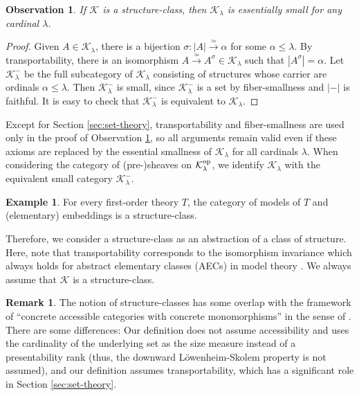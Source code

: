 \documentclass[10pt]{amsart}
\numberwithin{equation}{section}
\theoremstyle{plain}
\newtheorem{obs}[theorem]{Observation}
\theoremstyle{definition}
\newtheorem{example}[theorem]{Example}
\newtheorem*{remark}{Remark}
\newcommand{\K}{\mathcal{K}}
\newcommand{\edge}[1]{\overset{#1}{\longrightarrow}}
\begin{document}
\begin{obs}\label{obs:essentially-small}
If $\K$ is a structure-class, then $\K_\lambda$ is essentially small for any cardinal $\lambda$.
\end{obs}

\begin{proof}
Given $A\in\K_\lambda$, there is a bijection $\sigma\colon |A|\edge{\simeq}\alpha$ for some $\alpha\leq\lambda$.
By transportability, there is an isomorphism $A\edge{\simeq} A^\sigma\in\K_\lambda$ such that $|A^\sigma|=\alpha$.
Let $\K_\lambda^-$ be the full subcategory of $\K_\lambda$ consisting of structures whose carrier are ordinals $\alpha\leq\lambda$.
Then $\K_\lambda^-$ is small, since $\K_\lambda^-$ is a set by fiber-smallness and $|-|$ is faithful.
It is easy to check that $\K_\lambda^-$ is equivalent to $\K_\lambda$.
\end{proof}


Except for Section \ref{sec:set-theory}, transportability and fiber-smallness are used only in the proof of Observation \ref{obs:essentially-small}, so all arguments remain valid even if these axioms are replaced by the essential smallness of $\K_\lambda$ for all cardinals $\lambda$.
When considering the category of (pre-)sheaves on $\K_\lambda^{\rm op}$, we identify $\K_\lambda$ with the equivalent small category $\K_\lambda^-$.


\begin{example}
For every first-order theory $T$, the category of models of $T$ and (elementary) embeddings is a structure-class.
\end{example}

Therefore, we consider a structure-class as an abstraction of a class of structure.
Here, note that transportability corresponds to the isomorphism invariance which always holds for abstract elementary classes (AECs) in model theory \cite{She09}.
We always assume that $\K$ is a structure-class.

\begin{remark}
The notion of structure-classes has some overlap with the framework of ``concrete accessible categories with concrete monomorphisms'' in the sense of \cite{LiRo16}.
There are some differences: Our definition does not assume accessibility and uses the cardinality of the underlying set as the size measure instead of a presentability rank (thus, the downward L\"owenheim-Skolem property is not assumed), and our definition assumes transportability, which has a significant role in Section \ref{sec:set-theory}.
\end{remark}
\end{document}
